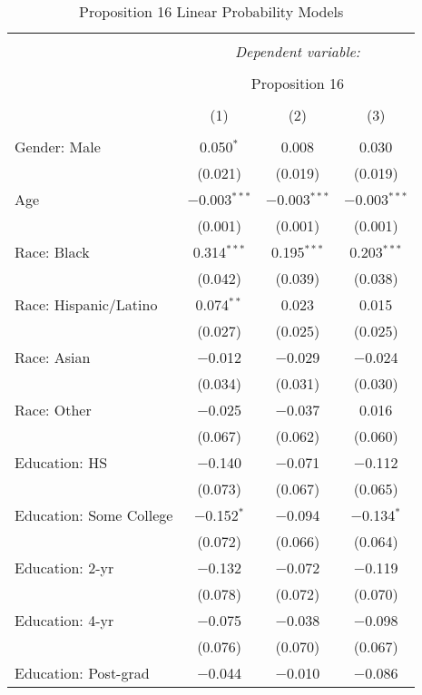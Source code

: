 
\begin{table}[!htbp] \centering 
  \caption{Proposition 16 Linear Probability Models} 
  \label{} 
\footnotesize 
\begin{tabular}{@{\extracolsep{5pt}}lccc} 
\\[-1.8ex]\hline 
\hline \\[-1.8ex] 
 & \multicolumn{3}{c}{\textit{Dependent variable:}} \\ 
\cline{2-4} 
\\[-1.8ex] & \multicolumn{3}{c}{Proposition 16} \\ 
\\[-1.8ex] & (1) & (2) & (3)\\ 
\hline \\[-1.8ex] 
 Gender: Male & 0.050$^{*}$ & 0.008 & 0.030 \\ 
  & (0.021) & (0.019) & (0.019) \\ 
  Age & $-$0.003$^{***}$ & $-$0.003$^{***}$ & $-$0.003$^{***}$ \\ 
  & (0.001) & (0.001) & (0.001) \\ 
  Race: Black & 0.314$^{***}$ & 0.195$^{***}$ & 0.203$^{***}$ \\ 
  & (0.042) & (0.039) & (0.038) \\ 
  Race: Hispanic/Latino & 0.074$^{**}$ & 0.023 & 0.015 \\ 
  & (0.027) & (0.025) & (0.025) \\ 
  Race: Asian & $-$0.012 & $-$0.029 & $-$0.024 \\ 
  & (0.034) & (0.031) & (0.030) \\ 
  Race: Other & $-$0.025 & $-$0.037 & 0.016 \\ 
  & (0.067) & (0.062) & (0.060) \\ 
  Education: HS & $-$0.140 & $-$0.071 & $-$0.112 \\ 
  & (0.073) & (0.067) & (0.065) \\ 
  Education: Some College & $-$0.152$^{*}$ & $-$0.094 & $-$0.134$^{*}$ \\ 
  & (0.072) & (0.066) & (0.064) \\ 
  Education: 2-yr & $-$0.132 & $-$0.072 & $-$0.119 \\ 
  & (0.078) & (0.072) & (0.070) \\ 
  Education: 4-yr & $-$0.075 & $-$0.038 & $-$0.098 \\ 
  & (0.076) & (0.070) & (0.067) \\ 
  Education: Post-grad & $-$0.044 & $-$0.010 & $-$0.086 \\ 

\end{tabular}
\end{table}
